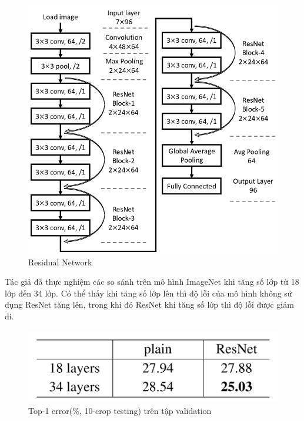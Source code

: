 \documentclass[a4paper, 12pt]{article}
\begin{document}
\begin{figure}[H]
    \begin{center}
        \includegraphics[scale=0.4]{img/resnet}
        \caption{Residual Network}
    \end{center}
\end{figure}

Tác giả đã thực nghiệm các so sánh trên mô hình ImageNet khi tăng số lớp từ 18 lớp đến 34 lớp. Có thể thấy khi tăng số lớp lên thì độ lỗi của mô hình không sử dụng ResNet tăng lên, trong khi đó ResNet khi tăng số lớp thì độ lỗi được giảm đi.

\begin{figure}[H]
    \begin{center}
        \includegraphics[scale=0.3]{img/resnet-cmp}
        \caption{Top-1 error(\%, 10-crop testing) trên tập validation}
    \end{center}
\end{figure}
\end{document}
